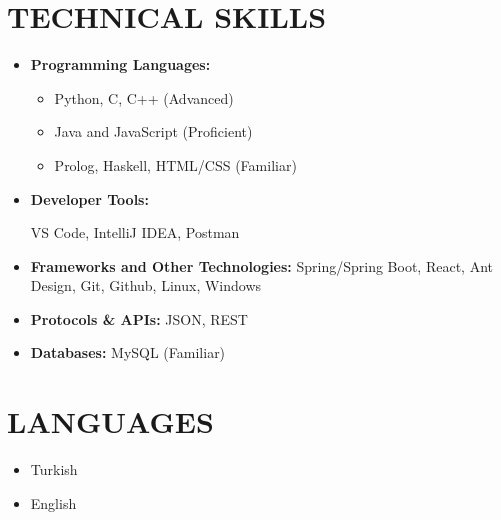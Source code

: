 \begin{minipage}[t]{0.8\textwidth}
  \section{TECHNICAL SKILLS}
    \begin{multicols}{2}
      \begin{itemize}[leftmargin=0.25in, itemsep=1pt]
        \item \textbf{Programming Languages:} 
          \begin{itemize}[label={-}, leftmargin=0.2in]
            \item Python, C, C++ (Advanced)
            \item Java and JavaScript (Proficient)
            \item Prolog, Haskell, HTML/CSS (Familiar)
          \end{itemize}
        \vspace*{\fill}

        \item \textbf{Developer Tools:} 
          
          VS Code, IntelliJ IDEA, Postman

        \item \textbf{Frameworks and Other Technologies:} 
          Spring/Spring Boot, React, Ant Design, Git, Github, Linux, Windows
        
        \item \textbf{Protocols \& APIs:} 
          JSON, REST

        \item \textbf{Databases:} 
          MySQL (Familiar)
      \end{itemize}
    \end{multicols}
\end{minipage}
\begin{minipage}[t]{0.18\textwidth}
  \section{LANGUAGES}
  \begin{itemize}[leftmargin=0.25in, itemsep=1pt]
    \item Turkish
    \item English
  \end{itemize}
\end{minipage}
